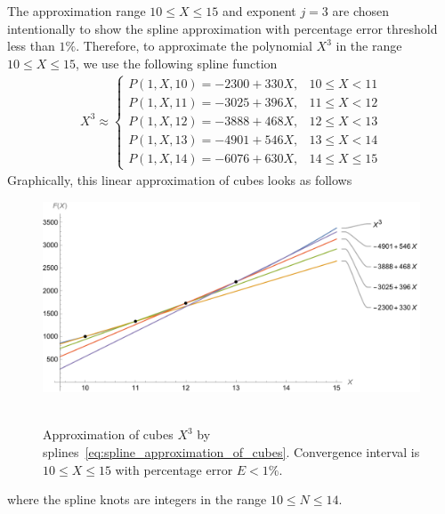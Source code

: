 The approximation range $10 \leq X \leq 15$ and exponent $j=3$ are chosen intentionally to show the spline approximation with
percentage error threshold less than $1\%$.
Therefore, to approximate the polynomial $X^3$ in the range $10 \leq X \leq 15$, we use the following spline function
\begin{align}
    X^3 \approx
    \begin{cases}
        P(1,X,10) = -2300 + 330X, & 10 \leq X < 11 \\
        P(1,X,11) = -3025 + 396X, & 11 \leq X < 12 \\
        P(1,X,12) = -3888 + 468X, & 12 \leq X < 13 \\
        P(1,X,13) = -4901 + 546X, & 13 \leq X < 14 \\
        P(1,X,14) = -6076 + 630X, & 14 \leq X \leq 15
    \end{cases}
    \label{eq:spline_approximation_of_cubes}
\end{align}
Graphically, this linear approximation of cubes looks as follows
\begin{figure}[H]
    \centering
    \includegraphics[width=1\textwidth]{sections/images/08_plots_of_cubes_power_with_p_2_10_15}
    ~\caption{
        Approximation of cubes $X^3$ by splines~\eqref{eq:spline_approximation_of_cubes}.
        Convergence interval is $10 \leq X \leq 15$ with percentage error $E < 1\%$.
    }
    \label{fig:08_plots_of_cubes_power_with_p_2_10_15}
\end{figure}
where the spline knots are integers in the range $10 \leq N \leq 14$.


